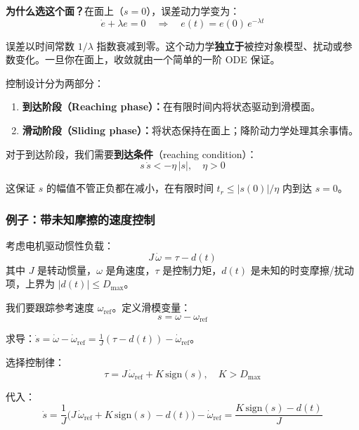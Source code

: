 \textbf{为什么选这个面？}在面上（$s = 0$），误差动力学变为：
\begin{equation}
\dot{e} + \lambda e = 0 \quad \Longrightarrow \quad e(t) = e(0)\,e^{-\lambda t}
\end{equation}

误差以时间常数 $1/\lambda$ 指数衰减到零。这个动力学\textbf{独立于}被控对象模型、扰动或参数变化。一旦你在面上，收敛就由一个简单的一阶 ODE 保证。

控制设计分为两部分：
\begin{enumerate}
    \item \textbf{到达阶段（Reaching phase）：}在有限时间内将状态驱动到滑模面。
    \item \textbf{滑动阶段（Sliding phase）：}将状态保持在面上；降阶动力学处理其余事情。
\end{enumerate}

对于到达阶段，我们需要\textbf{到达条件}（reaching condition）：
\begin{equation}
s\,\dot{s} < -\eta\,|s|, \quad \eta > 0
\end{equation}

这保证 $s$ 的幅值不管正负都在减小，在有限时间 $t_r \leq |s(0)|/\eta$ 内到达 $s = 0$。

\subsubsection{例子：带未知摩擦的速度控制}

考虑电机驱动惯性负载：
\begin{equation}
J\,\dot{\omega} = \tau - d(t)
\end{equation}
其中 $J$ 是转动惯量，$\omega$ 是角速度，$\tau$ 是控制力矩，$d(t)$ 是未知的时变摩擦/扰动项，上界为 $|d(t)| \leq D_{\max}$。

我们要跟踪参考速度 $\omega_{\text{ref}}$。定义滑模变量：
\begin{equation}
s = \omega - \omega_{\text{ref}}
\end{equation}

求导：$\dot{s} = \dot{\omega} - \dot{\omega}_{\text{ref}} = \frac{1}{J}(\tau - d(t)) - \dot{\omega}_{\text{ref}}$。

选择控制律：
\begin{equation}
\tau = J\,\dot{\omega}_{\text{ref}} + K\,\mathrm{sign}(s), \quad K > D_{\max}
\end{equation}

代入：
\begin{equation}
\dot{s} = \frac{1}{J}\bigl(J\,\dot{\omega}_{\text{ref}} + K\,\mathrm{sign}(s) - d(t)\bigr) - \dot{\omega}_{\text{ref}} = \frac{K\,\mathrm{sign}(s) - d(t)}{J}
\end{equation}

